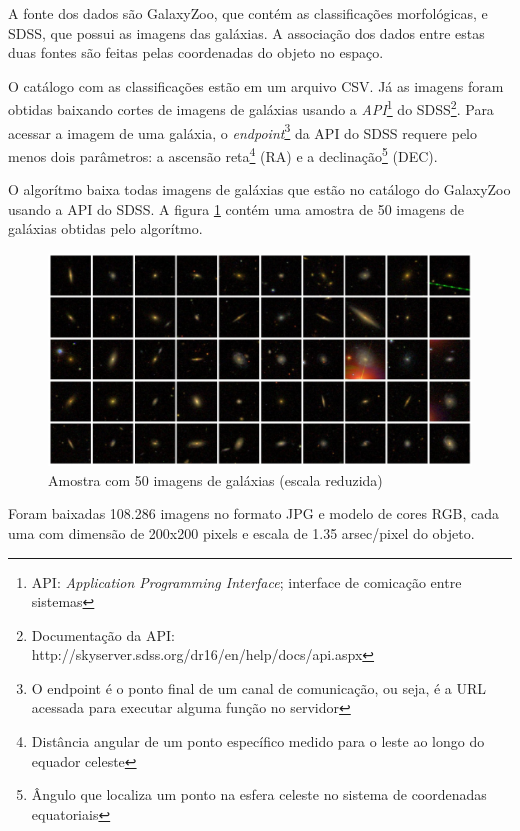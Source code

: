 A fonte dos dados são GalaxyZoo, que contém as classificações morfológicas, e SDSS, que possui as imagens das galáxias. A associação dos dados entre estas duas fontes são feitas pelas coordenadas do objeto no espaço.

O catálogo com as classificações estão em um arquivo CSV. Já as imagens foram obtidas baixando cortes de imagens de galáxias usando a \emph{API}\footnote{API: \emph{Application Programming Interface}; interface de comicação entre sistemas} do SDSS\footnote{Documentação da API: http://skyserver.sdss.org/dr16/en/help/docs/api.aspx}. Para acessar a imagem de uma galáxia, o \emph{endpoint}\footnote{O endpoint é o ponto final de um canal de comunicação, ou seja, é a URL acessada para executar alguma função no servidor} da API do SDSS requere pelo menos dois parâmetros: a ascensão reta\footnote{Distância angular de um ponto específico medido para o leste ao longo do equador celeste} (RA) e a declinação\footnote{Ângulo que localiza um ponto na esfera celeste no sistema de coordenadas equatoriais} (DEC).

O algorítmo baixa todas imagens de galáxias que estão no catálogo do GalaxyZoo usando a API do SDSS. A figura \ref{fig:galaxy_grid} contém uma amostra de 50 imagens de galáxias obtidas pelo algorítmo.

\begin{figure}[h!]
    \centering
    \includegraphics[width=\textwidth]{figures/galaxy_grid.jpg}
    \caption{Amostra com 50 imagens de galáxias (escala reduzida)}
    \label{fig:galaxy_grid}
\end{figure}

Foram baixadas 108.286 imagens no formato JPG e modelo de cores RGB, cada uma com dimensão de 200x200 pixels e escala de 1.35 arsec/pixel do objeto.

